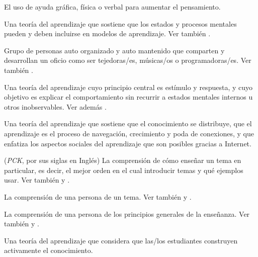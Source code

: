 \begin{description}
 El uso de ayuda gráfica,
física o verbal para aumentar el pensamiento.

 Una teoría del aprendizaje que sostiene que los estados 
y procesos mentales pueden y deben incluirse en modelos de aprendizaje. Ver también
.

 Grupo de personas auto organizado y auto mantenido
que comparten y desarrollan un oficio como ser tejedoras/es, músicas/os o programadoras/es. Ver también
.

 Una teoría del aprendizaje cuyo principio central
es estímulo y respuesta, y cuyo objetivo es explicar el comportamiento sin recurrir
a estados mentales internos u otros inobservables. Ver
además .

 Una teoría del aprendizaje que sostiene que el conocimiento se distribuye,
que el aprendizaje es el proceso de navegación, crecimiento y poda de conexiones, y que enfatiza los aspectos
sociales del aprendizaje que son posibles gracias a Internet.

 (\emph{PCK}, por sus siglas en Inglés) 
La comprensión de cómo enseñar un tema en particular, es decir, el mejor orden en el cual introducir temas y qué ejemplos usar. 
Ver también 
y .

 La comprensión de una
persona de un tema. Ver también
y .

 La
comprensión de una persona de los principios generales de la enseñanza. Ver también
y .

 Una teoría del aprendizaje que considera que
las/los estudiantes construyen activamente el conocimiento.


\end{description}
